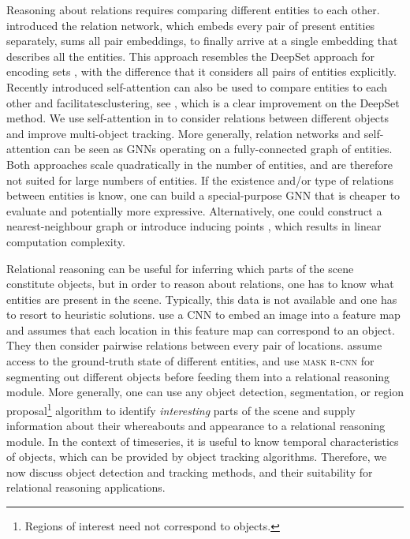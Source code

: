 	Reasoning about relations requires comparing different entities to each other.
    \cite{Santoro2017} introduced the relation network, which embeds every pair of present entities separately, sums all pair embeddings, to finally arrive at a single embedding that describes all the entities.
    This approach resembles the DeepSet approach for encoding sets \citep{Zaheer2017}, with the difference that it considers all pairs of entities explicitly.
    Recently introduced self-attention \citep{Vaswani17} can also be used to compare entities to each other and facilitates\eg clustering, see \cite{Lee2019set}, which is a clear improvement on the DeepSet method.
    We use self-attention in  to consider relations between different objects and improve multi-object tracking.
    More generally, relation networks and self-attention can be seen as \glspl{GNN} operating on a fully-connected graph of entities.
    Both approaches scale quadratically in the number of entities, and are therefore not suited for large numbers of entities. 
    If the existence and/or type of relations between entities is know, one can build a special-purpose \gls{GNN} \citep{Schlichtkrull2017relgraph} that is cheaper to evaluate and potentially more expressive.
    Alternatively, one could construct a nearest-neighbour graph \citep{Ramachandran2019standalone} or introduce inducing points \citep{Lee2019set}, which results in linear computation complexity.
	 
	Relational reasoning can be useful for inferring which parts of the scene constitute objects, but in order to reason about relations, one has to know what entities are present in the scene. 
	Typically, this data is not available and one has to resort to heuristic solutions.
	\cite{Santoro2017} use a \gls{CNN} to embed an image into a feature map and assumes that each location in this feature map can correspond to an object. 
	They then consider pairwise relations between every pair of locations.
	\cite{Battaglia2016,Baker2019tooluse} assume access to the ground-truth state of different entities, and \cite{Yi2019cleverer} use \textsc{mask r-cnn} \citep{He2017maskrcnn} for segmenting out different objects before feeding them into a relational reasoning module.
	More generally, one can use any object detection, segmentation, or region proposal\footnote{Regions of interest need not correspond to objects.} algorithm to identify \textit{interesting} parts of the scene and supply information about their whereabouts and appearance to a relational reasoning module.
	In the context of timeseries, it is useful to know temporal characteristics of objects, which can be provided by object tracking algorithms.
	Therefore, we now discuss object detection and tracking methods, and their suitability for relational reasoning applications.
	 
